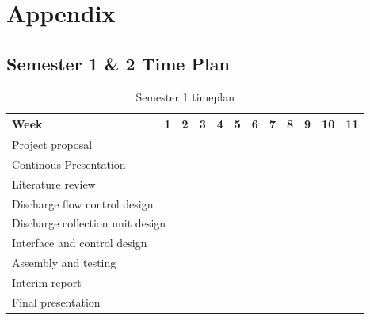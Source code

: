 \appendix
\section{Appendix}

\subsection{Semester 1 \& 2 Time Plan}
\begin{table}[H]
\centering
\begin{tabular}{|ll|l|l|l|l|l|l|l|l|l|l|}
\hline
\multicolumn{1}{|l|}{\textbf{Week}} & \textbf{1} & \textbf{2} & \textbf{3} & \textbf{4} & \textbf{5} & \textbf{6} & \textbf{7} & \textbf{8} & \textbf{9} & \textbf{10} & \textbf{11} \\ \hline
\multicolumn{1}{|l|}{Project proposal} &  & \cellcolor[HTML]{656565}{\color[HTML]{656565} } & \cellcolor[HTML]{656565}{\color[HTML]{656565} } & \cellcolor[HTML]{656565}{\color[HTML]{656565} } &  &  &  &  &  &  &  \\ \hline
\multicolumn{1}{|l|}{Continous Presentation} &  &  &  &  & \cellcolor[HTML]{656565} & \cellcolor[HTML]{656565} & \cellcolor[HTML]{656565} & \cellcolor[HTML]{656565} & \cellcolor[HTML]{656565} & \cellcolor[HTML]{656565} & \cellcolor[HTML]{656565} \\ \hline
\multicolumn{1}{|l|}{Literature review} &  &  &  &  &  & \cellcolor[HTML]{656565} & \cellcolor[HTML]{656565} & \cellcolor[HTML]{656565} & \cellcolor[HTML]{656565} & \cellcolor[HTML]{656565} & \cellcolor[HTML]{656565} \\ \hline
\multicolumn{1}{|l|}{Discharge flow control design} &  &  &  &  &  & \cellcolor[HTML]{656565} & \cellcolor[HTML]{656565} & \cellcolor[HTML]{656565} & \cellcolor[HTML]{656565} & \cellcolor[HTML]{656565} &  \\ \hline
\multicolumn{2}{|l|}{Discharge   collection unit design} &  &  &  &  &  & \cellcolor[HTML]{656565} & \cellcolor[HTML]{656565} & \cellcolor[HTML]{656565} & \cellcolor[HTML]{656565} &  \\ \hline
\multicolumn{1}{|l|}{Interface and control design} &  &  &  &  &  &  &  &  & \cellcolor[HTML]{656565} & \cellcolor[HTML]{656565} & \cellcolor[HTML]{656565} \\ \hline
\multicolumn{1}{|l|}{Assembly and testing} &  &  &  &  &  &  & \cellcolor[HTML]{656565} & \cellcolor[HTML]{656565} & \cellcolor[HTML]{656565} & \cellcolor[HTML]{656565} &  \\ \hline
\multicolumn{1}{|l|}{Interim report} &  &  &  &  &  &  &  &  & \cellcolor[HTML]{656565} & \cellcolor[HTML]{656565} & \cellcolor[HTML]{656565} \\ \hline
\multicolumn{1}{|l|}{Final presentation} &  &  &  &  &  &  &  &  &  &  & \cellcolor[HTML]{656565} \\ \hline
\end{tabular}
\caption{Semester 1 timeplan}
\end{table}

